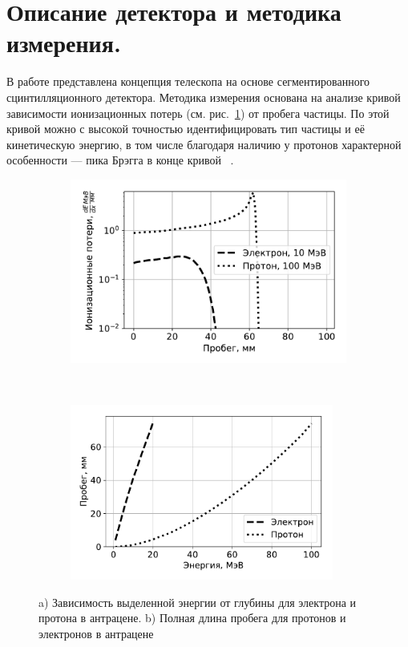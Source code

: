 \documentclass[12pt, a4paper, notitlepage, onecolumn]{article}
\begin{document}
\section*{Описание детектора и методика измерения.}
В работе представлена концепция телескопа на основе сегментированного сцинтилляционного детектора. Методика измерения основана на анализе кривой зависимости ионизационных потерь (см. рис.~\ref{pic-01-a}) от пробега частицы. По этой кривой можно с высокой точностью идентифицировать тип частицы и её кинетическую энергию, в том числе благодаря наличию у протонов характерной особенности --- пика Брэгга в конце кривой ~\cite{Gruppen}.
\begin{figure}[ht!]
	\begin{subfigure}[b]{0.5\textwidth}
    	\includegraphics[width=0.95\linewidth]{pictures/01_bregg.pdf}
        \caption{}
        \label{pic-01-a}
    \end{subfigure}
	~
    \begin{subfigure}[b]{0.5\textwidth}
		\includegraphics[width=0.95\textwidth]{pictures/02_range.pdf}
        \caption{}
        \label{pic-01-b}
    \end{subfigure}
    \caption{ a) Зависимость выделенной энергии от глубины для электрона и протона в антрацене. b) Полная длина пробега для протонов и электронов в антрацене}
\end{figure}
\end{document}
